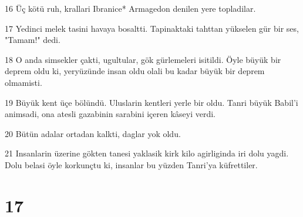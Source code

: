 \par 16 Üç kötü ruh, krallari Ibranice* Armagedon denilen yere topladilar.
\par 17 Yedinci melek tasini havaya bosaltti. Tapinaktaki tahttan yükselen gür bir ses, "Tamam!" dedi.
\par 18 O anda simsekler çakti, ugultular, gök gürlemeleri isitildi. Öyle büyük bir deprem oldu ki, yeryüzünde insan oldu olali bu kadar büyük bir deprem olmamisti.
\par 19 Büyük kent üçe bölündü. Uluslarin kentleri yerle bir oldu. Tanri büyük Babil'i animsadi, ona atesli gazabinin sarabini içeren kâseyi verdi.
\par 20 Bütün adalar ortadan kalkti, daglar yok oldu.
\par 21 Insanlarin üzerine gökten tanesi yaklasik kirk kilo agirliginda iri dolu yagdi. Dolu belasi öyle korkunçtu ki, insanlar bu yüzden Tanri'ya küfrettiler.

\chapter{17}

